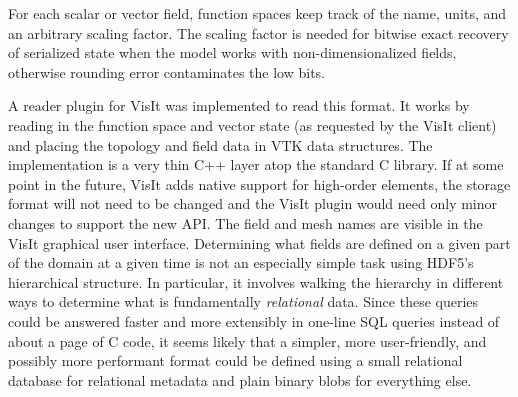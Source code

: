 For each scalar or vector field, function spaces keep track of the name, units, and an arbitrary scaling factor.
The scaling factor is needed for bitwise exact recovery of serialized state when the model works with non-dimensionalized fields, otherwise rounding error contaminates the low bits.

A reader plugin for VisIt was implemented to read this format.
It works by reading in the function space and vector state (as requested by the VisIt client) and placing the topology and field data in VTK data structures.
The implementation is a very thin C++ layer atop the standard C library.
If at some point in the future, VisIt adds native support for high-order elements, the storage format will not need to be changed and the VisIt plugin would need only minor changes to support the new API.
The field and mesh names are visible in the VisIt graphical user interface.
Determining what fields are defined on a given part of the domain at a given time is not an especially simple task using HDF5's hierarchical structure.
In particular, it involves walking the hierarchy in different ways to determine what is fundamentally \emph{relational} data.
Since these queries could be answered faster and more extensibly in one-line SQL queries instead of about a page of C code, it seems likely that a simpler, more user-friendly, and possibly more performant format could be defined using a small relational database for relational metadata and plain binary blobs for everything else.
